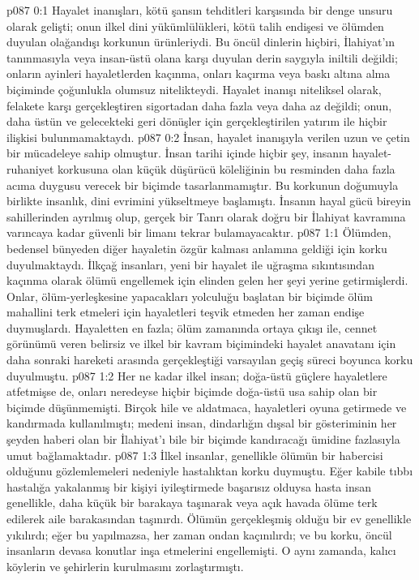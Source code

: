 \vs p087 0:1 Hayalet inanışları, kötü şansın tehditleri karşısında bir denge unsuru olarak gelişti; onun ilkel dini yükümlülükleri, kötü talih endişesi ve ölümden duyulan olağandışı korkunun ürünleriydi. Bu öncül dinlerin hiçbiri, İlahiyat’ın tanınmasıyla veya insan\hyp{}üstü olana karşı duyulan derin saygıyla iniltili değildi; onların ayinleri hayaletlerden kaçınma, onları kaçırma veya baskı altına alma biçiminde çoğunlukla olumsuz nitelikteydi. Hayalet inanışı niteliksel olarak, felakete karşı gerçekleştiren sigortadan daha fazla veya daha az değildi; onun, daha üstün ve gelecekteki geri dönüşler için gerçekleştirilen yatırım ile hiçbir ilişkisi bulunmamaktaydı.
\vs p087 0:2 İnsan, hayalet inanışıyla verilen uzun ve çetin bir mücadeleye sahip olmuştur. İnsan tarihi içinde hiçbir şey, insanın hayalet\hyp{}ruhaniyet korkusuna olan küçük düşürücü köleliğinin bu resminden daha fazla acıma duygusu verecek bir biçimde tasarlanmamıştır. Bu korkunun doğumuyla birlikte insanlık, dini evrimini yükseltmeye başlamıştı. İnsanın hayal gücü bireyin sahillerinden ayrılmış olup, gerçek bir Tanrı olarak doğru bir İlahiyat kavramına varıncaya kadar güvenli bir limanı tekrar bulamayacaktır.
\vs p087 1:1 Ölümden, bedensel bünyeden diğer hayaletin özgür kalması anlamına geldiği için korku duyulmaktaydı. İlkçağ insanları, yeni bir hayalet ile uğraşma sıkıntısından kaçınma olarak ölümü engellemek için elinden gelen her şeyi yerine getirmişlerdi. Onlar, ölüm\hyp{}yerleşkesine yapacakları yolculuğu başlatan bir biçimde ölüm mahallini terk etmeleri için hayaletleri teşvik etmeden her zaman endişe duymuşlardı. Hayaletten en fazla; ölüm zamanında ortaya çıkışı ile, cennet görünümü veren belirsiz ve ilkel bir kavram biçimindeki hayalet anavatanı için daha sonraki hareketi arasında gerçekleştiği varsayılan geçiş süreci boyunca korku duyulmuştu.
\vs p087 1:2 Her ne kadar ilkel insan; doğa\hyp{}üstü güçlere hayaletlere atfetmişse de, onları neredeyse hiçbir biçimde doğa\hyp{}üstü usa sahip olan bir biçimde düşünmemişti. Birçok hile ve aldatmaca, hayaletleri oyuna getirmede ve kandırmada kullanılmıştı; medeni insan, dindarlığın dışsal bir gösteriminin her şeyden haberi olan bir İlahiyat’ı bile bir biçimde kandıracağı ümidine fazlasıyla umut bağlamaktadır.
\vs p087 1:3 İlkel insanlar, genellikle ölümün bir habercisi olduğunu gözlemlemeleri nedeniyle hastalıktan korku duymuştu. Eğer kabile tıbbı hastalığa yakalanmış bir kişiyi iyileştirmede başarısız olduysa hasta insan genellikle, daha küçük bir barakaya taşınarak veya açık havada ölüme terk edilerek aile barakasından taşınırdı. Ölümün gerçekleşmiş olduğu bir ev genellikle yıkılırdı; eğer bu yapılmazsa, her zaman ondan kaçınılırdı; ve bu korku, öncül insanların devasa konutlar inşa etmelerini engellemişti. O aynı zamanda, kalıcı köylerin ve şehirlerin kurulmasını zorlaştırmıştı.
